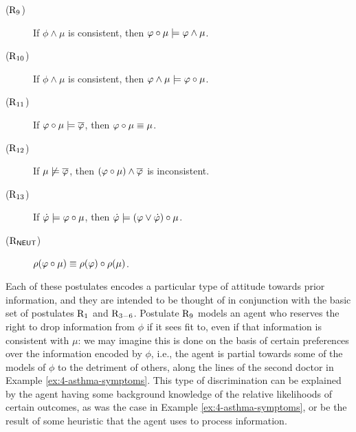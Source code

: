 \begin{description}
	\item[($\mathrm{R}_{9}$)] If $\phi\land\mu$ is consistent, then $\varphi\circ\mu\models\varphi\land\mu$.
	\item[($\mathrm{R}_{10}$)] If $\phi\land\mu$ is consistent, then $\varphi\land\mu\models\varphi\circ\mu$.
	\item[($\mathrm{R}_{11}$)] If $\varphi\circ\mu\models\overline{\varphi}$, then $\varphi\circ\mu\equiv\mu$.
	\item[($\mathrm{R}_{12}$)] If $\mu\not\models\overline{\varphi}$, then $(\varphi\circ\mu)\land\overline{\varphi}$ is inconsistent.
	\item[($\mathrm{R}_{13}$)] If $\dot{\varphi}\models\varphi\circ\mu$, then $\dot{\varphi}\models(\varphi\lor\dot{\varphi})\circ\mu$.
	\item[($\mathrm{R}_{\mathsf{NEUT}}$)] $\rho(\varphi\circ\mu)\equiv\rho(\varphi)\circ\rho(\mu)$.
\end{description}

Each of these postulates encodes a particular type 
of attitude towards prior information,
and they are intended to be thought of in conjunction 
with the basic set of postulates $\mathrm{R}_{1}$ and $\mathrm{R}_{3-6}$.
Postulate $\mathrm{R}_{9}$ models an agent who reserves the right 
to drop information from $\phi$ if it sees fit to,
even if that information is consistent with $\mu$:
we may imagine this is done on the basis of certain 
preferences over the information encoded by $\phi$,
i.e., the agent is partial towards some of the models 
of $\phi$ to the detriment of others,
along the lines of the second doctor in Example \ref{ex:4-asthma-symptoms}.
This type of discrimination can be explained
by the agent having some background knowledge 
of the relative likelihoods of certain outcomes,
as was the case in Example \ref{ex:4-asthma-symptoms},
or be the result of some heuristic that the agent uses
to process information.

